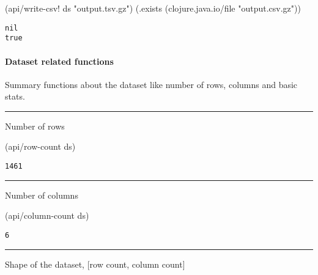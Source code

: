 \documentclass[]{article}
\newenvironment{Shaded}{\begin{snugshade}}{\end{snugshade}}
\newcommand{\StringTok}[1]{\textcolor[rgb]{0.31,0.60,0.02}{#1}}
\newcommand{\NormalTok}[1]{#1}
\let\oldparagraph\paragraph
\renewcommand{\paragraph}[1]{\oldparagraph{#1}\mbox{}}
\begin{document}
\begin{Shaded}
\begin{Highlighting}[]
\NormalTok{(api/write-csv! ds }\StringTok{"output.tsv.gz"}\NormalTok{)}
\NormalTok{(.exists (clojure.java.io/file }\StringTok{"output.csv.gz"}\NormalTok{))}
\end{Highlighting}
\end{Shaded}

\begin{verbatim}
nil
true
\end{verbatim}

\paragraph{Dataset related functions}\label{dataset-related-functions}

Summary functions about the dataset like number of rows, columns and
basic stats.

\begin{center}\rule{0.5\linewidth}{0.5pt}\end{center}

Number of rows

\begin{Shaded}
\begin{Highlighting}[]
\NormalTok{(api/row-count ds)}
\end{Highlighting}
\end{Shaded}

\begin{verbatim}
1461
\end{verbatim}

\begin{center}\rule{0.5\linewidth}{0.5pt}\end{center}

Number of columns

\begin{Shaded}
\begin{Highlighting}[]
\NormalTok{(api/column-count ds)}
\end{Highlighting}
\end{Shaded}

\begin{verbatim}
6
\end{verbatim}

\begin{center}\rule{0.5\linewidth}{0.5pt}\end{center}

Shape of the dataset, {[}row count, column count{]}
\end{document}
